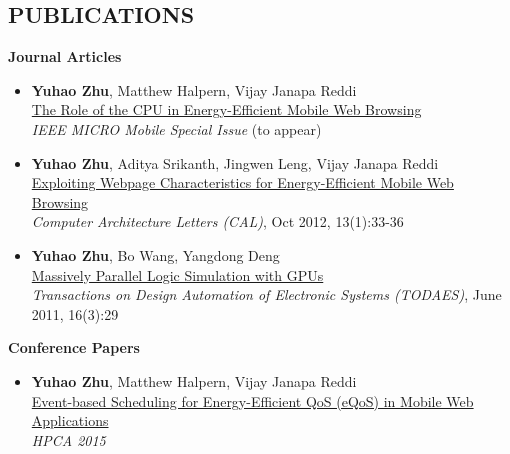 \documentclass[margin, 9pt]{res} %
\begin{document}
\begin{resume}
 
\vspace*{-5pt}
\section{PUBLICATIONS}

{\large\textbf{Journal Articles}}

\begin{itemize}[leftmargin=*] \itemsep -2pt
	\item \textbf{Yuhao Zhu}, Matthew Halpern, Vijay Janapa Reddi\\
          \href{}{The Role of the CPU in Energy-Efficient Mobile Web Browsing}\\
          \textit{IEEE MICRO Mobile Special Issue} (to appear)

	\item \textbf{Yuhao Zhu}, Aditya Srikanth, Jingwen Leng, Vijay Janapa Reddi\\
          \href{http://yuhaozhu.com/pubs/cal12.pdf}{Exploiting Webpage Characteristics for Energy-Efficient Mobile Web Browsing}\\
          \textit{Computer Architecture Letters (CAL)}, Oct 2012, 13(1):33-36

	\item \textbf{Yuhao Zhu}, Bo Wang, Yangdong Deng\\
          \href{http://yuhaozhu.com/pubs/todaes11.pdf}{Massively Parallel Logic Simulation with GPUs}\\
          \textit{Transactions on Design Automation of Electronic Systems (TODAES)}, June 2011, 16(3):29
\end{itemize}

\vspace*{7pt}
{\large\textbf{Conference Papers}}

\begin{itemize}[leftmargin=*] \itemsep -2pt
	\item \textbf{Yuhao Zhu}, Matthew Halpern, Vijay Janapa Reddi\\
          \href{}{Event-based Scheduling for Energy-Efficient QoS (eQoS) in Mobile Web Applications}\\
          \textit{HPCA 2015}


\end{itemize}
\end{resume}
\end{document}
